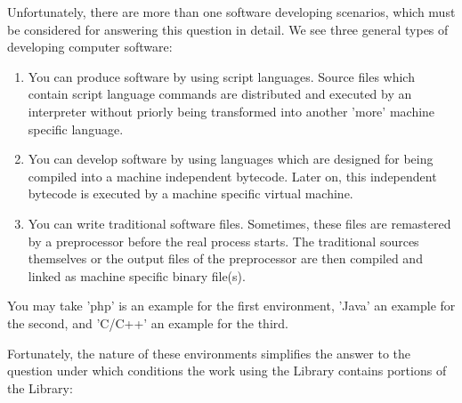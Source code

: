 %
%
%
%
%

Unfortunately, there are more than one software developing scenarios, which must
be considered for answering this question in detail. We see three general types
of developing computer software:

\begin{enumerate}
  \item You can produce software by using script languages. Source files which
  contain script language commands are distributed and executed by an
  interpreter without priorly being transformed into another 'more' machine
  specific language.
  \item You can develop software by using languages which are designed for being
  compiled into a machine independent bytecode. Later on, this independent
  bytecode is executed by a machine specific virtual machine.
  \item You can write traditional software files. Sometimes, these files are
  remastered by a preprocessor before the real process starts. The traditional
  sources themselves or the output files of the preprocessor are then compiled
  and linked as machine specific binary file(s).
\end{enumerate}
  
You may take 'php' is an example for the first environment, 'Java' an example
for the second, and 'C/C++' an example for the third.

Fortunately, the nature of these environments simplifies the answer to the
question under which conditions the work using the Library contains portions of
the Library:

